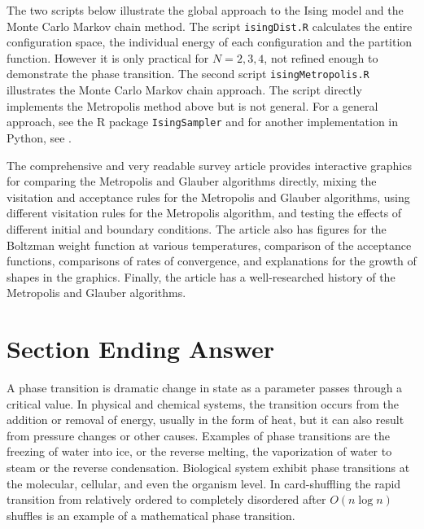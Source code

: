 \documentclass[12pt]{article}
\begin{document}
The two scripts below illustrate the global approach to the Ising model
and the Monte Carlo Markov chain method.  The script \texttt{isingDist.R}
calculates the entire configuration space, the individual energy of each
configuration and the partition function.  However it is only practical
for \( N = 2, 3, 4 \), not refined enough to demonstrate the phase
transition.  The second script \texttt{isingMetropolis.R} illustrates the
Monte Carlo Markov chain approach.  The script directly implements the
Metropolis method above but is not general.  For a general
approach, see the R package \texttt{IsingSampler}
\cite{epskamp20} and for another implementation in Python, see
\cite{schlusser18}.

The comprehensive and very readable survey article
\cite{hayes21} provides interactive graphics for comparing the
Metropolis and Glauber algorithms directly, mixing the visitation and
acceptance rules for the Metropolis and Glauber algorithms, using
different visitation rules for the Metropolis algorithm, and testing the
effects of different initial and boundary conditions.  The article also
has figures for the Boltzman weight function at various temperatures,
comparison of the acceptance functions, comparisons of rates of
convergence, and explanations for the growth of shapes in the graphics.
Finally, the article has a well-researched history of the Metropolis and
Glauber algorithms.



\section*{Section Ending Answer}

A phase transition is dramatic change in state as a parameter passes
through a critical value.  In physical and chemical systems, the
transition occurs from the addition or removal of energy, usually in the
form of heat, but it can also result from pressure changes or other
causes.  Examples of phase transitions are the freezing of water into
ice, or the reverse melting, the vaporization of water to steam or the
reverse condensation.  Biological system exhibit phase transitions at
the molecular, cellular, and even the organism level.  In card-shuffling
the rapid transition from relatively ordered to completely disordered
after \( O(n \log n) \) shuffles is an example of a mathematical phase
transition.
\end{document}
